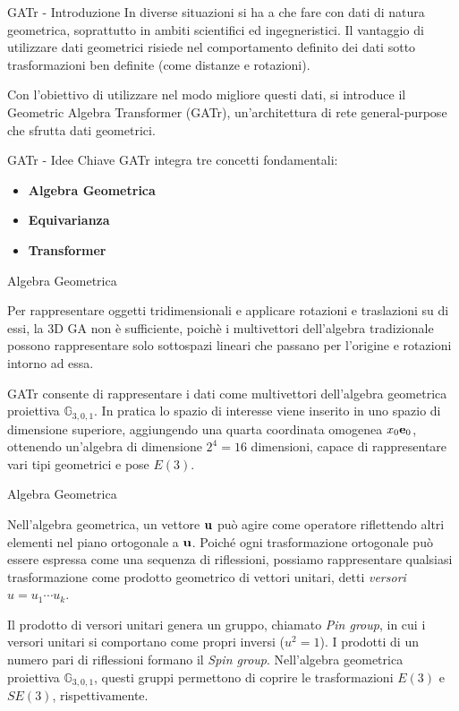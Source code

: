 \begin{frame}{GATr - Introduzione}
    In diverse situazioni si ha a che fare con dati di natura geometrica, soprattutto
    in ambiti scientifici ed ingegneristici. Il vantaggio di utilizzare dati geometrici
    risiede nel comportamento definito dei dati sotto trasformazioni ben definite 
    (come distanze e rotazioni).

    Con l'obiettivo di utilizzare nel modo migliore questi dati, si introduce il 
    Geometric Algebra Transformer (GATr), un'architettura di rete general-purpose 
    che sfrutta dati geometrici. 
\end{frame}

\begin{frame}{GATr - Idee Chiave}
    GATr integra tre concetti fondamentali:
    \begin{itemize}
        \item \textbf{Algebra Geometrica}
        \item \textbf{Equivarianza}
        \item \textbf{Transformer}
    \end{itemize}
\end{frame}

\begin{frame}{Algebra Geometrica}

    Per rappresentare oggetti tridimensionali e applicare rotazioni e traslazioni su di 
    essi, la 3D GA non è sufficiente, poichè i multivettori dell'algebra tradizionale 
    possono rappresentare solo sottospazi lineari che passano per l'origine e rotazioni 
    intorno ad essa. 

    GATr consente di rappresentare i dati come multivettori dell'algebra geometrica 
    proiettiva \(\mathbb{G}_{3,0,1}\). In pratica lo spazio di interesse viene inserito 
    in uno spazio di dimensione superiore, aggiungendo una quarta coordinata omogenea 
    \(x_0 \mathbf{e}_{0}\), ottenendo un'algebra di dimensione \(2^4 = 16\) dimensioni, capace di 
    rappresentare vari tipi geometrici e pose \(E(3)\).
\end{frame}

\begin{frame}{Algebra Geometrica}

    Nell’algebra geometrica, un vettore \( \mathbf{u} \) può agire come operatore riflettendo 
    altri elementi nel piano ortogonale a \( \mathbf{u} \). 
    Poiché ogni trasformazione ortogonale può essere espressa come una sequenza di riflessioni, 
    possiamo rappresentare qualsiasi trasformazione come prodotto geometrico di vettori 
    unitari, detti \textit{versori}  \( u = u_1 \cdots u_k \).

    Il prodotto di versori unitari genera un gruppo, chiamato \textit{Pin group}, 
    in cui i versori unitari si comportano come propri inversi (\( u^2 = 1 \)). 
    I prodotti di un numero pari di riflessioni formano il \textit{Spin group}. 
    Nell’algebra geometrica proiettiva \( \mathbb{G}_{3,0,1} \), questi gruppi 
    permettono di coprire le trasformazioni \( E(3) \) e \( SE(3) \), rispettivamente.
\end{frame}

